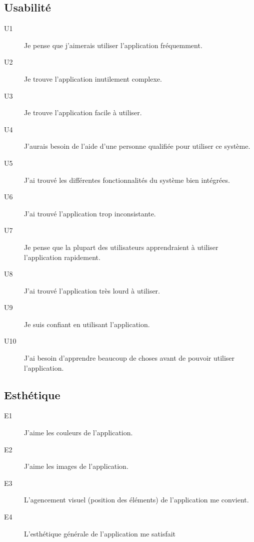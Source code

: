 \documentclass[a4paper, 11pt]{article}
\begin{document}
        \subsection*{Usabilité}
            \begin{description}
                \item[U1] Je pense que j'aimerais utiliser l'application fréquemment.
                \item[U2] Je trouve l'application inutilement complexe.
                \item[U3] Je trouve l'application facile à utiliser.
                \item[U4] J'aurais besoin de l'aide d'une personne qualifiée pour utiliser ce système.
                \item[U5] J'ai trouvé les différentes fonctionnalités du système bien intégrées.
                \item[U6] J'ai trouvé l'application trop inconsistante.
                \item[U7] Je pense que la plupart des utilisateurs apprendraient à utiliser l'application rapidement.
                \item[U8] J'ai trouvé l'application très lourd à utiliser.
                \item[U9] Je suis confiant en utilisant l'application.
                \item[U10] J'ai besoin d'apprendre beaucoup de choses avant de pouvoir utiliser l'application.
            \end{description}

        \subsection*{Esthétique}
            \begin{description}
                \item[E1] J'aime les couleurs de l'application.
                \item[E2] J'aime les images de l'application.
                \item[E3] L'agencement visuel (position des éléments) de l'application me convient.
                \item[E4] L'esthétique générale de l'application me satisfait
            \end{description}
\end{document}
